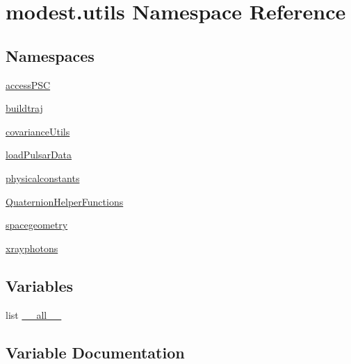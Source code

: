 \hypertarget{namespacemodest_1_1utils}{}\section{modest.\+utils Namespace Reference}
\label{namespacemodest_1_1utils}
\subsection*{Namespaces}
\begin{DoxyCompactItemize}
\item 
 \hyperlink{namespacemodest_1_1utils_1_1accessPSC}{access\+P\+SC}
\item 
 \hyperlink{namespacemodest_1_1utils_1_1buildtraj}{buildtraj}
\item 
 \hyperlink{namespacemodest_1_1utils_1_1covarianceUtils}{covariance\+Utils}
\item 
 \hyperlink{namespacemodest_1_1utils_1_1loadPulsarData}{load\+Pulsar\+Data}
\item 
 \hyperlink{namespacemodest_1_1utils_1_1physicalconstants}{physicalconstants}
\item 
 \hyperlink{namespacemodest_1_1utils_1_1QuaternionHelperFunctions}{Quaternion\+Helper\+Functions}
\item 
 \hyperlink{namespacemodest_1_1utils_1_1spacegeometry}{spacegeometry}
\item 
 \hyperlink{namespacemodest_1_1utils_1_1xrayphotons}{xrayphotons}
\end{DoxyCompactItemize}
\subsection*{Variables}
\begin{DoxyCompactItemize}
\item 
list \hyperlink{namespacemodest_1_1utils_acd9a8b6ab3a03ab38f1c184c44fb92cb}{\+\_\+\+\_\+all\+\_\+\+\_\+}
\end{DoxyCompactItemize}


\subsection{Variable Documentation}
